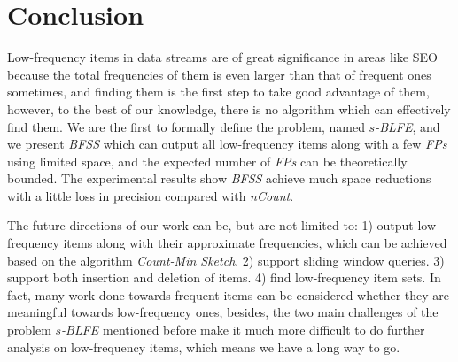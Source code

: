 \documentclass[conference]{IEEEtran}
\begin{document}
%




\section{Conclusion}
Low-frequency items in data streams are of great significance in areas like SEO because the total frequencies of them is even larger than that of frequent ones sometimes, and finding them is the first step to take good advantage of them, however, to the best of our knowledge, there is no algorithm which can effectively find them. We are the first to formally define the problem, named \emph{$s$-BLFE}, and we present \emph{BFSS} which can output all low-frequency items along with a few \emph{FPs} using limited space, and the expected number of \emph{FPs} can be theoretically bounded. The experimental results show \emph{BFSS} achieve much space reductions with a little loss in precision compared with \emph{nCount}.\par
The future directions of our work can be, but are not limited to: 1) output low-frequency items along with their approximate frequencies, which can be achieved based on the algorithm \emph{Count-Min Sketch}. 2) support sliding window queries. 3) support both insertion and deletion of items. 4) find low-frequency item sets. In fact, many work done towards frequent items can be considered whether they are meaningful towards low-frequency ones, besides, the two main challenges of the problem \emph{$s$-BLFE} mentioned before make it much more difficult to do further analysis on low-frequency items, which means we have a long way to go.
\end{document}
